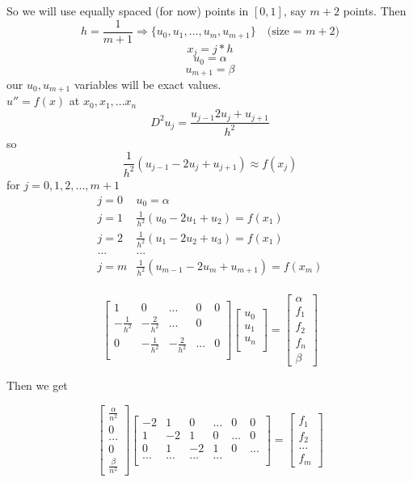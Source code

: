 \documentclass[10pt]{article}
\begin{document}
So we will use equally spaced (for now) points in $[0,1]$, say $m + 2$ points. Then
\[h = \frac{1}{m + 1} \Rightarrow \{u_0, u_1, ..., u_m, u_{m+1}\} \quad \text{(size = $m + 2$)}\]
\[x_j = j * h\]
\[u_0 = \alpha\]
\[u_{m+1} = \beta\]
our $u_0, u_{m+1}$ variables will be exact values.\\
$u'' = f(x)$ at $x_0, x_1, ... x_n$\\

\[D^2 u_j = \frac{u_{j-1} 2u_j + u_{j+1}}{h^2}\]
so
\[\frac{1}{h^2}(u_{j-1} - 2u_j + u_{j+1}) \approx f(x_j)\]
for $j = 0,1,2,...,m+1$\\
\[\begin{matrix}
    j = 0 & u_0 = \alpha\\
    j = 1 & \frac{1}{h^2}(u_0 - 2u_1 + u_2) = f(x_1)\\
    j = 2 &  \frac{1}{h^2}(u_1 - 2u_2 + u_3) = f(x_1)\\
    ... & ...\\
    j = m &  \frac{1}{h^2}(u_{m - 1} - 2u_m + u_{m + 1}) = f(x_m)\\
\end{matrix}
\]

$$
\begin{bmatrix}
    1 & 0 & ... & 0 & 0\\
    -\frac{1}{h^2} & -\frac{2}{h^2} & ... & 0\\
    0 &  -\frac{1}{h^2} & -\frac{2}{h^2} & ... & 0\\
\end{bmatrix}
\begin{bmatrix}
    u_0\\
    u_1\\
    u_n\\
\end{bmatrix}
=
\begin{bmatrix}
    \alpha\\
    f_1\\
    f_2\\
    f_n\\
    \beta
\end{bmatrix}
$$

Then we get

$$
\begin{bmatrix}
    \frac{\alpha}{n^2}\\
    0\\
    ...\\
    0\\
    \frac{\beta}{n^2}
\end{bmatrix}
\begin{bmatrix}
    -2 & 1 & 0 & ... & 0 & 0\\
    1 & -2 & 1 & 0 & ... & 0\\
    0 & 1 & -2 & 1 & 0 & ...\\
    ... & ... & ... & ...\\
\end{bmatrix}
=
\begin{bmatrix}
    f_1\\
    f_2\\
    ...\\
    f_m
\end{bmatrix}
$$
\end{document}
